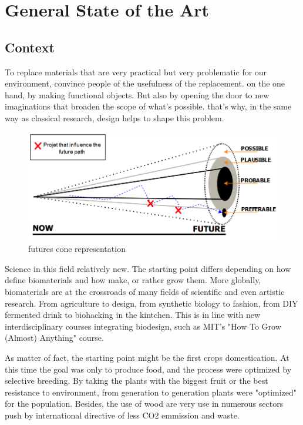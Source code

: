 \chapter{General State of the Art}


\section{Context}

To replace materials that are very practical but very problematic for our environment, convince people of the usefulness of the replacement. on the one hand, by making functional objects. But also by opening the door to new imaginations that broaden the scope of what's possible. that's why, in the same way as classical research, design helps to shape this problem. 
\begin{figure}[h] %
    \centering
    \includegraphics{images/futures_cone2.png}
    \caption{futures cone representation}
    \label{fig:futures code}
\end{figure}
Science in this field relatively new. The starting point differs depending on how define biomaterials and how make, or rather grow them. 
More globally, biomaterials are at the crossroads of many fields of scientific and even artistic research. From agriculture to design, from synthetic biology to fashion, from DIY fermented drink to biohacking in the kintchen\cite{CiteTheOdin}.
This is in line with new interdisciplinary courses integrating biodesign, such as MIT's "How To Grow (Almost) Anything" course\cite{CiteMITHTGAA}. 

As matter of fact, the starting point might be the first crops domestication. At this time the goal was only to produce food, and the process were optimized by selective breeding. By taking the plants with the biggest fruit or the best resistance to environment, from generation to generation plants were "optimized" for the population.
Besides, the use of wood are very use in numerous sectors\cite{ramage2017wood} push by international directive of less CO2 emmission and waste. 
  
